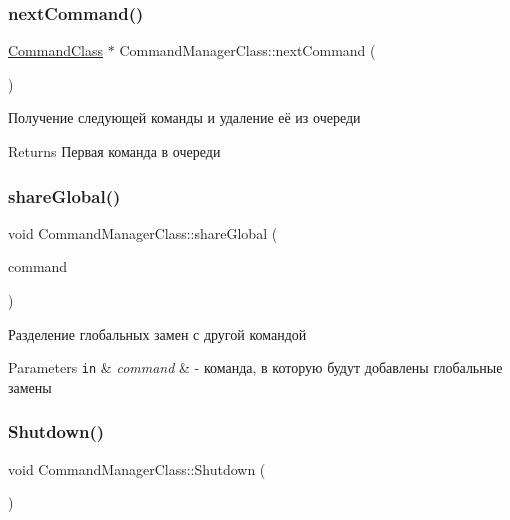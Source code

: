 \subsubsection{\texorpdfstring{next\+Command()}{nextCommand()}}
{\footnotesize\ttfamily \hyperlink{class_command_class}{Command\+Class} $\ast$ Command\+Manager\+Class\+::next\+Command (\begin{DoxyParamCaption}{ }\end{DoxyParamCaption})}



Получение следующей команды и удаление её из очереди 

\begin{DoxyReturn}{Returns}
Первая команда в очереди 
\end{DoxyReturn}
\mbox{\label{class_command_manager_class_a4b6e9c23906c953b4a89e480595d9da8}} 
\subsubsection{\texorpdfstring{share\+Global()}{shareGlobal()}}
{\footnotesize\ttfamily void Command\+Manager\+Class\+::share\+Global (\begin{DoxyParamCaption}\item[{\hyperlink{class_command_class}{Command\+Class} $\ast$}]{command }\end{DoxyParamCaption})\hspace{0.3cm}{\ttfamily [private]}}



Разделение глобальных замен с другой командой 


\begin{DoxyParams}[1]{Parameters}
\mbox{\tt in}  & {\em command} & -\/ команда, в которую будут добавлены глобальные замены \\
\hline
\end{DoxyParams}
\mbox{\label{class_command_manager_class_a5c111abbf6138d3abd5bd6d1713baa85}} 
\subsubsection{\texorpdfstring{Shutdown()}{Shutdown()}}
{\footnotesize\ttfamily void Command\+Manager\+Class\+::\+Shutdown (\begin{DoxyParamCaption}{ }\end{DoxyParamCaption})}



